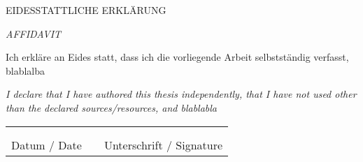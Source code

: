 
\vspace*{2cm}

{EIDESSTATTLICHE ERKLÄRUNG\par}
{\itshape{}AFFIDAVIT}

\vspace*{1cm}

Ich erkläre an Eides statt, dass ich die vorliegende Arbeit
selbstständig verfasst, blablalba

\vspace*{1cm}


{
\itshape 
I declare that I have authored this thesis independently, that I have
not used other than the declared sources/resources, and blablabla
}

\vspace*{4cm}


\begin{center}
\begin{tabular}{cp{2em}c} 
   \hspace{4cm}        & & \hspace{5cm} \\\cline{1-1}\cline{3-3}
                       & & \\[-3mm]
   {\footnotesize Datum / Date}  & & {\footnotesize Unterschrift /
    Signature}
\end{tabular}
\end{center}

\newpage
\newpage

